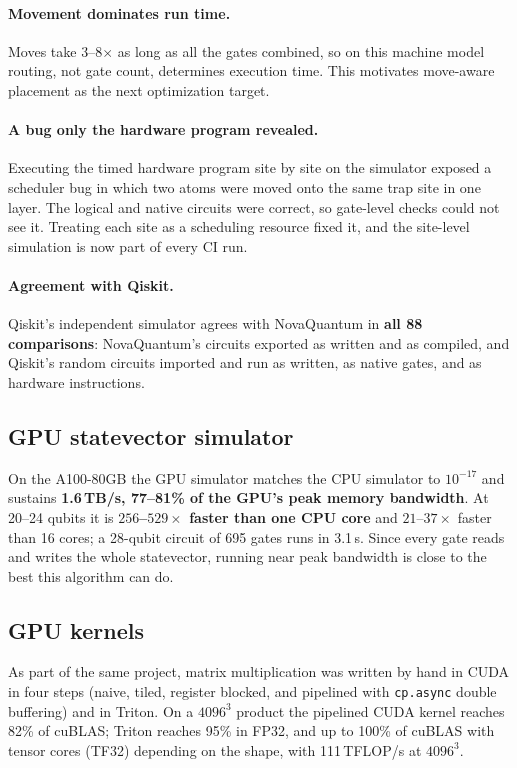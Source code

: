 \documentclass[11pt]{article}
\begin{document}
\paragraph{Movement dominates run time.} Moves take 3--8$\times$ as long as all the gates combined, so on this
machine model routing, not gate count, determines execution time. This motivates move-aware placement as the next
optimization target.

\paragraph{A bug only the hardware program revealed.} Executing the timed hardware program site by site on the
simulator exposed a scheduler bug in which two atoms were moved onto the same trap site in one layer. The logical
and native circuits were correct, so gate-level checks could not see it. Treating each site as a scheduling resource
fixed it, and the site-level simulation is now part of every CI run.

\paragraph{Agreement with Qiskit.} Qiskit's independent simulator agrees with NovaQuantum in \textbf{all 88
comparisons}: NovaQuantum's circuits exported as written and as compiled, and Qiskit's random circuits imported and
run as written, as native gates, and as hardware instructions.

\subsection{GPU statevector simulator}

On the A100-80GB the GPU simulator matches the CPU simulator to $10^{-17}$ and sustains \textbf{1.6\,TB/s, 77--81\%
of the GPU's peak memory bandwidth}. At 20--24 qubits it is \textbf{$256$--$529\times$ faster than one CPU core} and
$21$--$37\times$ faster than 16 cores; a 28-qubit circuit of 695 gates runs in 3.1\,s. Since every gate reads and
writes the whole statevector, running near peak bandwidth is close to the best this algorithm can do.

\subsection{GPU kernels}

As part of the same project, matrix multiplication was written by hand in CUDA in four steps (naive, tiled, register
blocked, and pipelined with \texttt{cp.async} double buffering) and in Triton. On a $4096^3$ product the pipelined
CUDA kernel reaches 82\% of cuBLAS; Triton reaches 95\% in FP32, and up to 100\% of cuBLAS with tensor cores
(TF32) depending on the shape, with 111\,TFLOP/s at $4096^3$.
\end{document}
